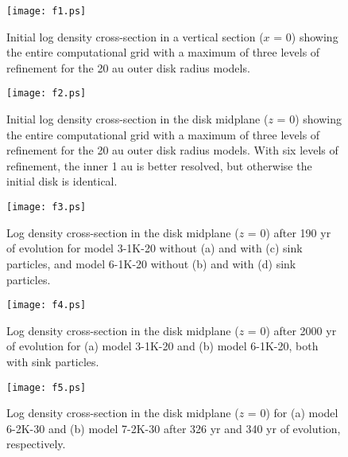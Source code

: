 \documentclass[12pt,preprint]{aastex}
\begin{document}
\begin{figure}
\vspace{-1.0in}
\texttt{[image: f1.ps]}
\vspace{0.5in}
\caption{Initial log density cross-section in a vertical section ($x$ = 0) showing the entire computational 
grid with a maximum of three levels of refinement for the 20 au outer disk radius models. }
\end{figure}
\clearpage

\begin{figure}
\vspace{-1.0in}
\texttt{[image: f2.ps]}
\vspace{0.5in}
\caption{Initial log density cross-section in the disk midplane ($z$ = 0) showing the entire computational 
grid with a maximum of three levels of refinement for the 20 au outer disk radius models. With six
levels of refinement, the inner 1 au is better resolved, but otherwise the initial disk is identical. }
\end{figure}
\clearpage


\begin{figure}
\vspace{-1.0in}
\texttt{[image: f3.ps]}
\vspace{0.5in}
\caption{Log density cross-section in the disk midplane ($z$ = 0) after 190 yr of evolution for
model 3-1K-20 without (a) and with (c) sink particles, and 
model 6-1K-20 without (b) and with (d) sink particles. }
\end{figure}
\clearpage


\begin{figure}
\vspace{-1.0in}
\texttt{[image: f4.ps]}
\vspace{0.5in}
\caption{Log density cross-section in the disk midplane ($z$ = 0) after 2000 yr of evolution for
(a) model 3-1K-20 and (b) model 6-1K-20, both with sink particles. }
\end{figure}
\clearpage


\begin{figure}
\vspace{-1.0in}
\texttt{[image: f5.ps]}
\vspace{0.5in}
\caption{Log density cross-section in the disk midplane ($z$ = 0)  for
(a) model 6-2K-30 and (b) model 7-2K-30 after 326 yr and 340 yr of evolution, respectively. }
\end{figure}
\clearpage
\end{document}
